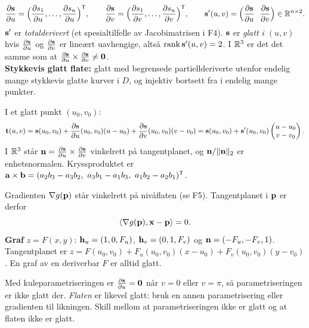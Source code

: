 \begin{defn}
\[
\frac{\partial \mathbf{s}}{\partial u}=\Bigl(\frac{\partial s_1}{\partial u},\dots,\frac{\partial s_n}{\partial u}\Bigr)^{\mathsf{T}},\qquad \frac{\partial \mathbf{s}}{\partial v}=\Bigl(\frac{\partial s_1}{\partial v},\dots,\frac{\partial s_n}{\partial v}\Bigr)^{\mathsf{T}},\qquad
\mathbf{s}'(u,v)=\Bigl(\frac{\partial \mathbf{s}}{\partial u}\ \ \frac{\partial \mathbf{s}}{\partial v}\Bigr)\in\mathbb{R}^{n\times2}.
\]
$\mathbf{s}'$ er \emph{totalderivert} (et spesialtilfelle av Jacobimatrisen i F4). $\mathbf{s}$ er \emph{glatt i $(u,v)$} hvis $\frac{\partial \mathbf{s}}{\partial u}$ og $\frac{\partial \mathbf{s}}{\partial v}$ er lineært uavhengige, altså $\operatorname{rank}\mathbf{s}'(u,v)=2$. I $\mathbb{R}^3$ er det det samme som at $\frac{\partial \mathbf{s}}{\partial u}\times\frac{\partial \mathbf{s}}{\partial v}\neq\mathbf{0}$.\\
\textbf{Stykkevis glatt flate:} glatt med begrensede partiellderiverte utenfor endelig mange stykkevis glatte kurver i $D$, og injektiv bortsett fra i endelig mange punkter.
\end{defn}

\begin{teorem}
I et glatt punkt $(u_0,v_0)$:
\[
\mathbf{t}(u,v)=\mathbf{s}(u_0,v_0)+\frac{\partial \mathbf{s}}{\partial u}(u_0,v_0)(u-u_0)+\frac{\partial \mathbf{s}}{\partial v}(u_0,v_0)(v-v_0)=\mathbf{s}(u_0,v_0)+\mathbf{s}'(u_0,v_0)\begin{pmatrix}u-u_0\\v-v_0\end{pmatrix}.
\]
I $\mathbb{R}^3$ står $\mathbf{n}=\frac{\partial \mathbf{s}}{\partial u}\times\frac{\partial \mathbf{s}}{\partial v}$ vinkelrett på tangentplanet, og $\mathbf{n}/\lVert \mathbf{n}\rVert_2$ er enhetsnormalen. Kryssproduktet er
$\vb a\times\vb b=(a_2b_3-a_3b_2,\ a_3b_1-a_1b_3,\ a_1b_2-a_2b_1)^\T$.
\end{teorem}

\begin{teorem}[flate gitt ved en likning $g(x,y,z)=c$ (prøveeksamen, oppg.~3)]
Gradienten $\nabla g(\mathbf{p})$ står vinkelrett på nivåflaten (se F5). Tangentplanet i $\mathbf{p}$ er derfor
\[
\langle \nabla g(\mathbf{p}),\mathbf{x}-\mathbf{p}\rangle=0.
\]
\textbf{Graf} $z=F(x,y)$: $\mathbf{h}_u=(1,0,F_u)$, $\mathbf{h}_v=(0,1,F_v)$ og $\mathbf{n}=(-F_u,-F_v,1)$. Tangentplanet er $z=F(u_0,v_0)+F_u(u_0,v_0)(x-u_0)+F_v(u_0,v_0)(y-v_0)$. En graf av en deriverbar $F$ er alltid glatt.
\end{teorem}

\begin{fallgruve}
Med kuleparametriseringen er $\frac{\partial \mathbf{s}}{\partial u}=\mathbf{0}$ når $v=0$ eller $v=\pi$, så parametriseringen er ikke glatt der. \emph{Flaten} er likevel glatt: bruk en annen parametrisering eller gradienten til likningen. Skill mellom at parametriseringen ikke er glatt og at flaten ikke er glatt.
\end{fallgruve}

